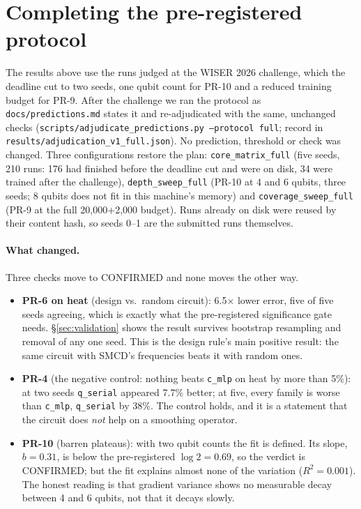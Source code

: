 \section{Completing the pre-registered protocol}
\label{sec:fullprotocol}

The results above use the runs judged at the WISER 2026 challenge, which the deadline
cut to two seeds, one qubit count for PR-10 and a reduced training budget for PR-9.
After the challenge we ran the protocol as \texttt{docs/predictions.md} states it and
re-adjudicated with the same, unchanged checks
(\texttt{scripts/adjudicate\_predictions.py --protocol full}; record in
\texttt{results/adjudication\_v1\_full.json}). No prediction, threshold or check was
changed. Three configurations restore the plan:
\texttt{core\_matrix\_full} (five seeds, 210 runs: 176 had finished before the deadline
cut and were on disk, 34 were trained after the challenge),
\texttt{depth\_sweep\_full} (PR-10 at 4 and 6 qubits, three seeds; 8 qubits does not fit
in this machine's memory) and \texttt{coverage\_sweep\_full} (PR-9 at the full
20{,}000+2{,}000 budget). Runs already on disk were reused by their content hash, so
seeds 0--1 are the submitted runs themselves.



\paragraph{What changed.} Three checks move to CONFIRMED and none moves the other way.
\begin{itemize}
  \item \textbf{PR-6 on heat} (design vs.\ random circuit): 6.5$\times$ lower error,
    five of five seeds agreeing, which is exactly what the pre-registered significance
    gate needs. \S\ref{sec:validation} shows the result survives bootstrap resampling
    and removal of any one seed. This is the design rule's main positive result: the
    same circuit with SMCD's frequencies beats it with random ones.
  \item \textbf{PR-4} (the negative control: nothing beats \texttt{c\_mlp} on heat by
    more than 5\%): at two seeds \texttt{q\_serial} appeared 7.7\% better; at five,
    every family is worse than \texttt{c\_mlp}, \texttt{q\_serial} by 38\%. The
    control holds, and it is a statement that the circuit does \emph{not} help on a
    smoothing operator.
  \item \textbf{PR-10} (barren plateaus): with two qubit counts the fit is defined. Its
    slope, $b=0.31$, is below the pre-registered $\log2=0.69$, so the verdict is
    CONFIRMED; but the fit explains almost none of the variation ($R^2=0.001$). The
    honest reading is that gradient variance shows no measurable decay between 4 and 6
    qubits, not that it decays slowly.
\end{itemize}

